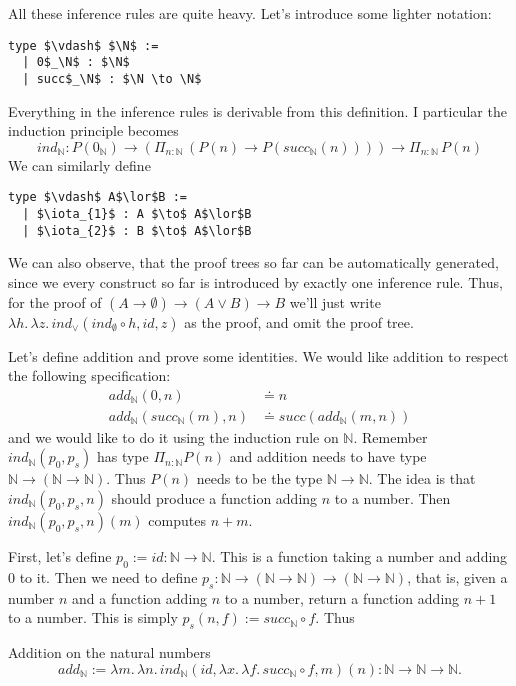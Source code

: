 \documentclass[a4paper, 12pt]{article}
\newcommand{\N}{\mathbb{N}}
\newcommand{\la}[1]{\lambda{#1}.\,}
\theoremstyle{changedot}
\theoremstyle{changedotbreak}
\theoremstyle{nonumberplain}
\begin{document}
All these inference rules are quite heavy. Let's introduce some lighter notation:

\begin{lstlisting}[mathescape=true]
  type $\vdash$ $\N$ :=
  | 0$_\N$ : $\N$
  | succ$_\N$ : $\N \to \N$
\end{lstlisting}

Everything in the inference rules is derivable from this definition. I particular the induction principle becomes \[ind_{\N} : P(0_{\N}) \to (\Pi_{n:\N}\, (P(n) \to P(succ_{\N}(n)))) \to \Pi_{n:\N}\, P(n)\] We can similarly define

\begin{lstlisting}[mathescape=true]
  type $\vdash$ A$\lor$B :=
  | $\iota_{1}$ : A $\to$ A$\lor$B
  | $\iota_{2}$ : B $\to$ A$\lor$B
\end{lstlisting}

We can also observe, that the proof trees so far can be automatically generated, since we every construct so far is introduced by exactly one inference rule. Thus, for the proof of $(A \to \emptyset) \to (A \lor B) \to B$ we'll just write $\la h \la z ind_{\lor}(ind_{\emptyset} \circ h, id, z)$ as the proof, and omit the proof tree.

Let's define addition and prove some identities. We would like addition to respect the following specification:
\begin{align*}
  \mathit{add}_{\N} (0, n) &\doteq n \\
  \mathit{add}_{\N} (succ_{\N}(m), n) &\doteq succ(\mathit{add}_{\N}(m, n))
\end{align*}
and we would like to do it using the induction rule on $\N$. Remember $ind_{\N}(p_{0}, p_{s})$ has type $\Pi_{n:\N} P(n)$ and addition needs to have type $\N \to (\N \to \N)$. Thus $P(n)$ needs to be the type $\N \to \N$. The idea is that $ind_{\N}(p_{0}, p_{s}, n)$ should produce a function adding $n$ to a number. Then $ind_{\N}(p_{0}, p_{s}, n)(m)$ computes $n+m$.

First, let's define $p_{0} := id : \N \to \N$. This is a function taking a number and adding 0 to it. Then we need to define $p_{s} : \N \to (\N \to \N) \to (\N \to \N)$, that is, given a number $n$ and a function adding $n$ to a number, return a function adding $n+1$ to a number. This is simply $p_{s}(n, f) := succ_{\N} \circ f$. Thus

\begin{definition}
  Addition on the natural numbers
  \[add_{\N} := \la m \la n ind_{\N}(id, \la x \la f succ_{\N} \circ f, m)(n) : \N \to \N \to \N.\]
\end{definition}
\end{document}
